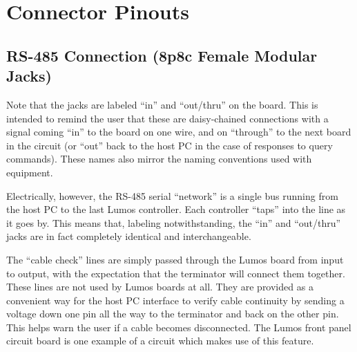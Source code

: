 \chapter{Connector Pinouts}
\section{RS-485 Connection (8p8c Female Modular Jacks)}
\begin{center}
\end{center}
Note that the jacks are labeled ``in'' and ``out/thru'' on the board.  This is intended to remind the user
that these are daisy-chained connections with a signal coming ``in'' to the board on one wire, and on ``through'' to
the next board in the circuit (or ``out'' back to the host PC in the case of responses to query commands).  These
names also mirror the naming conventions used with  equipment. 

Electrically, however, the RS-485 serial ``network'' is a single bus running from the host PC to the last Lumos
controller.  Each controller ``taps'' into the line as it goes by.  This means that, labeling notwithstanding,
the ``in'' and ``out/thru'' jacks are in fact completely identical and interchangeable.

The ``cable check'' lines are simply passed through the Lumos board from input to output, with the expectation that
the terminator will connect them together.  These lines are not used by Lumos boards at all.  They are provided as
a convenient way for the host PC interface to verify cable continuity by sending a voltage down one pin all
the way to the terminator and back on the other pin.  This helps warn the user if a cable becomes disconnected.
The Lumos front panel circuit board is one example of a circuit which makes use of this feature.

